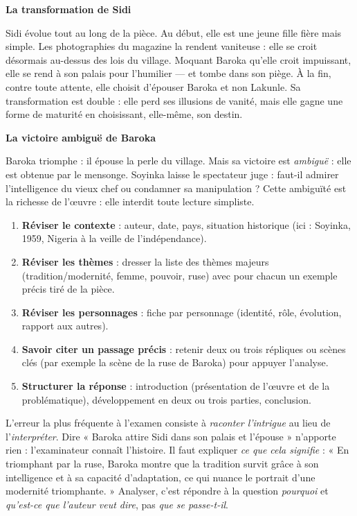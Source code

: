 \documentclass[11pt]{article}
\newcounter{popsec}
\newcounter{popsub}
\newcommand{\courssub}[1]{%
  \stepcounter{popsub}%
  \par\vspace{9pt}\noindent{\popxbold\fontsize{11.5}{13}\selectfont\color{popink}{\color{poporange}\thepopsec.\thepopsub}\hspace{6pt}#1}\par\nopagebreak\vspace{4pt}
}
\begin{document}
\textbf{La transformation de Sidi}\par

Sidi évolue tout au long de la pièce. Au début, elle est une jeune fille fière mais simple. Les photographies du magazine la rendent vaniteuse : elle se croit désormais au-dessus des lois du village. Moquant Baroka qu'elle croit impuissant, elle se rend à son palais pour l'humilier — et tombe dans son piège. À la fin, contre toute attente, elle choisit d'épouser Baroka et non Lakunle. Sa transformation est double : elle perd ses illusions de vanité, mais elle gagne une forme de maturité en choisissant, elle-même, son destin.

\textbf{La victoire ambiguë de Baroka}\par

Baroka triomphe : il épouse la perle du village. Mais sa victoire est \emph{ambiguë} : elle est obtenue par le mensonge. Soyinka laisse le spectateur juge : faut-il admirer l'intelligence du vieux chef ou condamner sa manipulation ? Cette ambiguïté est la richesse de l'œuvre : elle interdit toute lecture simpliste.

\courssub{Évaluation de l'étude de l'œuvre}

\begin{methode}
\begin{enumerate}
\item \textbf{Réviser le contexte} : auteur, date, pays, situation historique (ici : Soyinka, 1959, Nigeria à la veille de l'indépendance).
\item \textbf{Réviser les thèmes} : dresser la liste des thèmes majeurs (tradition/modernité, femme, pouvoir, ruse) avec pour chacun un exemple précis tiré de la pièce.
\item \textbf{Réviser les personnages} : fiche par personnage (identité, rôle, évolution, rapport aux autres).
\item \textbf{Savoir citer un passage précis} : retenir deux ou trois répliques ou scènes clés (par exemple la scène de la ruse de Baroka) pour appuyer l'analyse.
\item \textbf{Structurer la réponse} : introduction (présentation de l'œuvre et de la problématique), développement en deux ou trois parties, conclusion.
\end{enumerate}
\end{methode}

\begin{attention}
L'erreur la plus fréquente à l'examen consiste à \emph{raconter l'intrigue} au lieu de l'\emph{interpréter}. Dire « Baroka attire Sidi dans son palais et l'épouse » n'apporte rien : l'examinateur connaît l'histoire. Il faut expliquer \emph{ce que cela signifie} : « En triomphant par la ruse, Baroka montre que la tradition survit grâce à son intelligence et à sa capacité d'adaptation, ce qui nuance le portrait d'une modernité triomphante. » Analyser, c'est répondre à la question \emph{pourquoi} et \emph{qu'est-ce que l'auteur veut dire}, pas \emph{que se passe-t-il}.
\end{attention}
\end{document}
